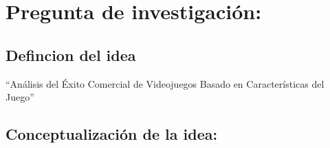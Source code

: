 \documentclass[
  letterpaper,
  DIV=11,
  numbers=noendperiod]{scrreprt}
\begin{document}
\hypertarget{pregunta-de-investigaciuxf3n}{%
\section{Pregunta de
investigación:}\label{pregunta-de-investigaciuxf3n}}

\hypertarget{defincion-del-idea}{%
\subsection{Defincion del idea}\label{defincion-del-idea}}

``Análisis del Éxito Comercial de Videojuegos Basado en Características
del Juego''

\hypertarget{conceptualizaciuxf3n-de-la-idea}{%
\subsection{Conceptualización de la
idea:}\label{conceptualizaciuxf3n-de-la-idea}}
\end{document}
